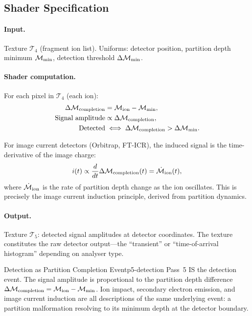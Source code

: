 \subsection{Shader Specification}

\paragraph{Input.}
Texture $\mathcal{T}_4$ (fragment ion list).  Uniforms: detector position,
partition depth minimum $\mathcal{M}_{\min}$, detection threshold $\Delta\mathcal{M}_{\min}$.

\paragraph{Shader computation.}

For each pixel in $\mathcal{T}_4$ (each ion):
\begin{align}
  \Delta\mathcal{M}_{\mathrm{completion}} &= \mathcal{M}_{\mathrm{ion}} - \mathcal{M}_{\min},
    \label{eq:ch22-completion}\\
  \text{Signal amplitude} &\propto \Delta\mathcal{M}_{\mathrm{completion}},
    \label{eq:ch22-signal}\\
  \text{Detected} &\iff \Delta\mathcal{M}_{\mathrm{completion}} > \Delta\mathcal{M}_{\min}.
    \label{eq:ch22-threshold}
\end{align}

For image current detectors (Orbitrap, FT-ICR), the induced signal is the
time-derivative of the image charge:
\begin{equation}
  i(t) \propto \frac{d}{dt}\Delta\mathcal{M}_{\mathrm{completion}}(t)
    = \dot{\mathcal{M}}_{\mathrm{ion}}(t),
\end{equation}
where $\dot{\mathcal{M}}_{\mathrm{ion}}$ is the rate of partition depth change as
the ion oscillates.  This is precisely the image current induction principle,
derived from partition dynamics.

\paragraph{Output.}
Texture $\mathcal{T}_5$: detected signal amplitudes at detector coordinates.
The texture constitutes the raw detector output---the ``transient'' or
``time-of-arrival histogram'' depending on analyser type.

\begin{consequence}{Detection as Partition Completion Event}{p5-detection}
  Pass~5 IS the detection event.  The signal amplitude is proportional to
  the partition depth difference $\Delta\mathcal{M}_{\mathrm{completion}} =
  \mathcal{M}_{\mathrm{ion}} - \mathcal{M}_{\min}$.  Ion impact, secondary electron
  emission, and image current induction are all descriptions of the same
  underlying event: a partition malformation resolving to its minimum depth
  at the detector boundary.
\end{consequence}

